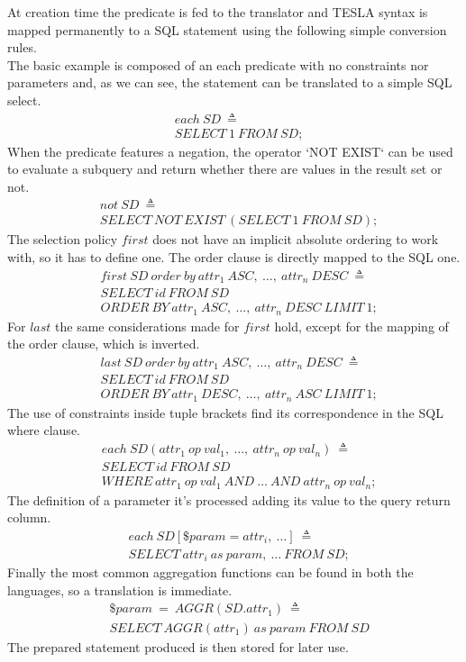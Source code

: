 At creation time the predicate is fed to the translator and TESLA syntax is mapped permanently to a SQL statement using the following simple conversion rules.\\
The basic example is composed of an each predicate with no constraints nor parameters and, as we can see, the statement can be translated to a simple SQL select.
\begin{align*}%
&each\ SD\ \triangleq\\
&SELECT\ 1\ FROM\ SD;
\end{align*}
When the predicate features a negation, the operator `NOT EXIST` can be used to evaluate a subquery and return whether there are values in the result set or not.
\begin{align*}%
&not\ SD\ \triangleq\\
&SELECT\ NOT\ EXIST\ (SELECT\ 1\ FROM\ SD);
\end{align*}
The selection policy $first$ does not have an implicit absolute ordering to work with, so it has to define one. The order clause is directly mapped to the SQL one.
\begin{align*}%
&first\ SD\ order\ by\ attr_1\ ASC,\ \ldots,\ attr_n\ DESC\ \triangleq\\
&SELECT\ id\ FROM\ SD\\
&ORDER\ BY\ attr_1\ ASC,\ \ldots,\ attr_n\ DESC\ LIMIT\ 1;
\end{align*}
For $last$ the same considerations made for $first$ hold, except for the mapping of the order clause, which is inverted.
\begin{align*}%
&last\ SD\ order\ by\ attr_1\ ASC,\ \ldots,\ attr_n\ DESC\ \triangleq\\
&SELECT\ id\ FROM\ SD\\
&ORDER\ BY\ attr_1\ DESC,\ \ldots,\ attr_n\ ASC\ LIMIT\ 1;
\end{align*}
The use of constraints inside tuple brackets find its correspondence in the SQL where clause.
\begin{align*}%
&each\ SD(attr_1\ op \ val_1,\ \ldots,\ attr_n\ op \ val_n)\ \triangleq\\
&SELECT\ id\ FROM\ SD\\
&WHERE\ attr_1\ op\ val_1\ AND\ \ldots\ AND\ attr_n\ op\ val_n;
\end{align*}
The definition of a parameter it's processed adding its value to the query return column.
\begin{align*}%
&each\ SD[\$param = attr_i,\ \ldots]\ \triangleq\\
&SELECT\ attr_i\ as\ param,\ \ldots\ FROM\ SD;
\end{align*}
Finally the most common aggregation functions can be found in both the languages, so a translation is immediate.
\begin{align*}%
&\$param\ =\ AGGR(SD.attr_1)\ \triangleq\\
&SELECT\ AGGR(attr_1)\ as\ param\ FROM\ SD
\end{align*}
The prepared statement produced is then stored for later use.

